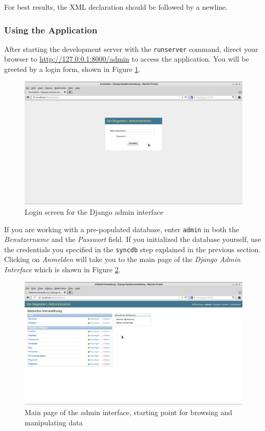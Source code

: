 For best results, the XML declaration should be followed by a newline.

\subsubsection{Using the Application}
\label{sec:use}

After starting the development server with the \texttt{runserver}
command, direct your browser to \url{http://127.0.0.1:8000/admin} to
access the application. You will be greeted by a login form, shown in
Figure \ref{fig:admin-login}.

\begin{figure}[h]
  \centering
  \includegraphics[scale=0.3]{img/admin-login}
  \caption{Login screen for the Django admin interface}
  \label{fig:admin-login}
\end{figure}

If you are working with a pre-populated database, enter \texttt{admin}
in both the \emph{Benutzername} and the \emph{Passwort} field. If you
initialized the database yourself, use the credentials you specified
in the \texttt{syncdb} step explained in the previous section.
Clicking on \emph{Anmelden} will take you to the main page of the
\emph{Django Admin Interface} which is shown in Figure
\ref{fig:admin-main}.

\begin{figure}[h]
  \centering
  \includegraphics[scale=0.3]{img/admin-main}
  \caption{Main page of the admin interface, starting point for
    browsing and manipulating data}
  \label{fig:admin-main}
\end{figure}

